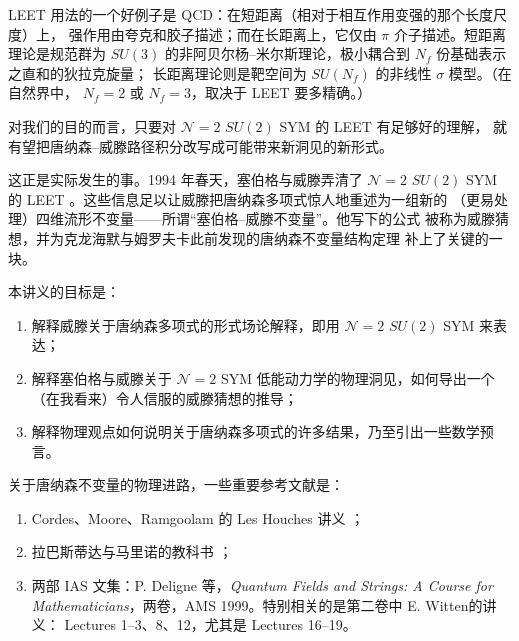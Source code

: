 
LEET 用法的一个好例子是 QCD：在短距离（相对于相互作用变强的那个长度尺度）上，
强作用由夸克和胶子描述；而在长距离上，它仅由 $\pi$ 介子描述。短距离理论是规范群为
$SU(3)$ 的非阿贝尔杨--米尔斯理论，极小耦合到 $N_{f}$ 份基础表示之直和的狄拉克旋量；
长距离理论则是靶空间为 $SU(N_{f})$ 的非线性 $\sigma$ 模型。（在自然界中，
$N_{f}=2$ 或 $N_{f}=3$，取决于 LEET 要多精确。）

对我们的目的而言，只要对 $\mathcal{N}=2$ $SU(2)$ SYM 的 LEET 有足够好的理解，
就有望把唐纳森--威滕路径积分改写成可能带来新洞见的新形式。

这正是实际发生的事。1994 年春天，塞伯格与威滕弄清了 $\mathcal{N}=2$ $SU(2)$ SYM 的
LEET \cite{ref47,ref46}。这些信息足以让威滕把唐纳森多项式惊人地重述为一组新的
（更易处理）四维流形不变量——所谓“塞伯格--威滕不变量”\cite{ref55}。他写下的公式
被称为威滕猜想，并为克龙海默与姆罗夫卡此前发现的唐纳森不变量结构定理 \cite{ref21}
补上了关键的一块。



本讲义的目标是：
\begin{enumerate}[leftmargin=2.2em, itemsep=2pt]
\item 解释威滕关于唐纳森多项式的形式场论解释，即用 $\mathcal{N}=2$ $SU(2)$ SYM 来表达；
\item 解释塞伯格与威滕关于 $\mathcal{N}=2$ SYM 低能动力学的物理洞见，如何导出一个
      （在我看来）令人信服的威滕猜想的推导；
\item 解释物理观点如何说明关于唐纳森多项式的许多结果，乃至引出一些数学预言。
\end{enumerate}

关于唐纳森不变量的物理进路，一些重要参考文献是：
\begin{enumerate}[leftmargin=2.2em, itemsep=2pt]
\item Cordes、Moore、Ramgoolam 的 Les Houches 讲义 \cite{ref4}；
\item 拉巴斯蒂达与马里诺的教科书 \cite{ref24}；
\item 两部 IAS 文集：P. Deligne 等，\emph{Quantum Fields and Strings: A Course for
      Mathematicians}，两卷，AMS 1999。特别相关的是第二卷中 E. Witten的讲义：
      Lectures 1--3、8、12，尤其是 Lectures 16--19。
\end{enumerate}

